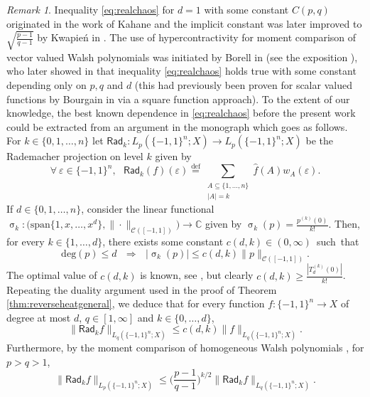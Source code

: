 \documentclass[11pt,reqno]{amsart}
\renewcommand{\leq}{\leqslant}
\renewcommand{\geq}{\geqslant}
\newcommand{\e}{\varepsilon}
\newcommand{\1}{\mathbf 1}
\theoremstyle{remark}
\newtheorem{remark}[theorem]{Remark}
\newcommand{\C}{\mathbb C}
\newcommand{\eqdef}{\stackrel{\mathrm{def}}{=}}
\renewcommand{\sigma}{\upsigma}
\newcommand{\ms}{\mathscr}
\newcommand{\msf}{\mathsf}
\begin{document}
\begin{remark} \label{rem:kwapien}
Inequality \eqref{eq:realchaos} for $d=1$ with some constant $C(p,q)$ originated in the work \cite{Kah64} of Kahane and the implicit constant was later improved to $\sqrt{\frac{p-1}{q-1}}$ by Kwapie\'{n} in \cite{Kwa76}. The use of hypercontractivity for moment comparison of vector valued Walsh polynomials was initiated by Borell in \cite{Bor79} (see the exposition \cite{Pis78}), who later showed in \cite{Bor84} that inequality \eqref{eq:realchaos} holds true with some constant depending only on $p,q$ and $d$ (this had previously been proven for scalar valued functions by Bourgain in \cite{Bou80} via a square function approach). To the extent of our knowledge, the best known dependence in \eqref{eq:realchaos} before the present work could be extracted from an argument in the monograph \cite[Proposition~6.5.1]{KW92} which goes as follows. For $k\in\{0,1,\ldots,n\}$ let $\msf{Rad}_k:L_p(\{-1,1\}^n;X)\to L_p(\{-1,1\}^n;X)$ be the Rademacher projection on level $k$ given by
\begin{equation}
\forall \ \e\in\{-1,1\}^n, \ \ \ \msf{Rad}_k(f)(\e) \eqdef \sum_{\substack{A\subseteq\{1,\ldots,n\}\\ |A|=k}} \widehat{f}(A) w_A(\e).
\end{equation}
If $d\in\{0,1,\ldots,n\}$, consider the linear functional $\sigma_k: \big( \mathrm{span}\{1,x,\ldots,x^d\}, \|\cdot\|_{\ms{C}([-1,1])}\big) \to \C$ given by $\sigma_k(p) = \frac{p^{(k)}(0)}{k!}$. Then, for every $k\in\{1,\ldots,d\}$, there exists some constant \mbox{$c(d,k)\in(0,\infty)$ such that}
\begin{equation}
\mathrm{deg}(p)\leq d \ \ \ \Longrightarrow \ \ \ |\sigma_k(p)| \leq c(d,k) \|p\|_{\ms{C}([-1,1])}.
\end{equation}
The optimal value of $c(d,k)$ is known, see \cite[p.~248]{BE95}, but clearly $c(d,k)\geq \frac{|T_d^{(k)}(0)|}{k!}$. Repeating the duality argument used in the proof of Theorem \ref{thm:reverseheatgeneral}, we deduce that for every function $f:\{-1,1\}^n\to X$ of degree at most $d$, $q\in[1,\infty]$ and $k\in\{0,\ldots,d\}$,
\begin{equation}\label{eq:radbounded}
\big\|\msf{Rad}_k f\big\|_{L_q(\{-1,1\}^n;X)} \leq c(d,k) \|f\|_{L_q(\{-1,1\}^n;X)}.
\end{equation}
Furthermore, by the moment comparison of homogeneous Walsh polynomials \cite{Bor79}, for $p>q>1$,
\begin{equation} \label{eq:borellhomogeneous}
\big\|\msf{Rad}_k f\big\|_{L_p(\{-1,1\}^n;X)} \leq \Big(\frac{p-1}{q-1}\Big)^{k/2} \big\|\msf{Rad}_k f\big\|_{L_q(\{-1,1\}^n;X)}.

\end{equation}
\end{remark}
\end{document}
